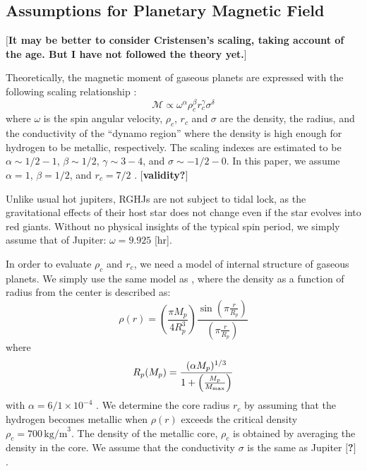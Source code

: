 \documentclass{emulateapj}
\def\memoYF#1{\color{red}$[${\bf #1}$]$ \color{black}}
\begin{document}
\subsection{Assumptions for Planetary Magnetic Field}
\label{ss:magneticfield}

\memoYF{It may be better to consider Cristensen's scaling, taking account of the age. But I have not followed the theory yet.}

Theoretically, the magnetic moment of gaseous planets are expressed with the following scaling relationship \citep{griebmeier2004}:
\begin{equation}
\mathcal{M} \propto  \omega ^{\alpha } \rho_c ^{\beta } r_c^{\gamma } \sigma ^{\delta }
\end{equation}
where $\omega $ is the spin angular velocity, $\rho _c$, $r_c$ and $\sigma $ are the density, the radius, and the conductivity of the ``dynamo region'' where the density is high enough for hydrogen to be metallic, respectively. 
The scaling indexes are estimated to be $\alpha \sim 1/2-1$, $\beta \sim 1/2$, $\gamma \sim 3-4$, and $\sigma \sim -1/2-0$. In this paper, we assume $\alpha =1$, $\beta =1/2$, and $r_c = 7/2$ \citep{sano1993}. \memoYF{validity?}

Unlike usual hot jupiters, RGHJs are not subject to tidal lock, as the gravitational effects of their host star does not change even if the star evolves into red giants. Without no physical insights of the typical spin period, we simply assume that of Jupiter: $\omega = 9.925$ [hr]. 

In order to evaluate $\rho _c $ and $r_c$, we need a model of internal structure of gaseous planets. We simply use the same model as \citet{griebmeier2004}, where the density as a function of radius from the center is described as:
\begin{equation}
\rho (r) = \left( \frac{\pi M_p}{4 R_p^3} \right) \frac{\sin \left( \pi \frac{r}{R_p} \right)}{\left( \pi \frac{r}{R_p} \right)} \label{eq:rho_r}
\end{equation}
where
\begin{equation}
R_p (M_p) = \frac{(\alpha M_p)^{1/3}}{1+\left( \frac{M_p}{M_{\rm max}} \right)} \label{eq:Rp}
\end{equation}
with $\alpha =6/1 \times 10^{-4}$ \citep{griebmeier2007}. 
We determine the core radius $r_c$ by assuming that the hydrogen becomes metallic when $\rho (r)$ exceeds the critical density $\rho_c=700\,\mbox{kg/m}^3$. The density of the metallic core, $\rho _c$ is obtained by averaging the density in the core. 
We assume that the conductivity $\sigma $ is the same as Jupiter \memoYF{?}. 
\end{document}
